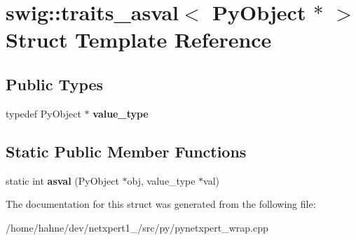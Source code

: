 \hypertarget{structswig_1_1traits__asval_3_01PyObject_01_5_01_4}{}\section{swig\+:\+:traits\+\_\+asval$<$ Py\+Object $\ast$ $>$ Struct Template Reference}
\label{structswig_1_1traits__asval_3_01PyObject_01_5_01_4}
\subsection*{Public Types}
\begin{DoxyCompactItemize}
\item 
typedef Py\+Object $\ast$ {\bfseries value\+\_\+type}\hypertarget{structswig_1_1traits__asval_3_01PyObject_01_5_01_4_ad50e5d06c5ffc618c4367791ed2c0aee}{}\label{structswig_1_1traits__asval_3_01PyObject_01_5_01_4_ad50e5d06c5ffc618c4367791ed2c0aee}

\end{DoxyCompactItemize}
\subsection*{Static Public Member Functions}
\begin{DoxyCompactItemize}
\item 
static int {\bfseries asval} (Py\+Object $\ast$obj, value\+\_\+type $\ast$val)\hypertarget{structswig_1_1traits__asval_3_01PyObject_01_5_01_4_a5343f0cbfdbd117628374a526a11fedb}{}\label{structswig_1_1traits__asval_3_01PyObject_01_5_01_4_a5343f0cbfdbd117628374a526a11fedb}

\end{DoxyCompactItemize}


The documentation for this struct was generated from the following file\+:\begin{DoxyCompactItemize}
\item 
/home/hahne/dev/netxpert1\+\_/src/py/pynetxpert\+\_\+wrap.\+cpp\end{DoxyCompactItemize}
